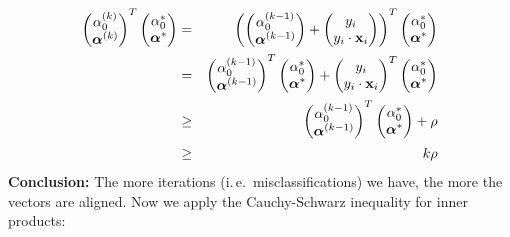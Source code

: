   \begin{eqnarray*}
    \begin{pmatrix}\alpha_0^{(k)}\\ \bm{\mathrm{\alpha}}^{(k)}\end{pmatrix}^T\begin{pmatrix}\alpha_0^*\\ \bm{\mathrm{\alpha}}^*\end{pmatrix} 
      &=&           \left( \begin{pmatrix}\alpha_0^{(k-1)}\\ \bm{\mathrm{\alpha}}^{(k-1)}\end{pmatrix} +  \begin{pmatrix}y_i\\ y_i\cdot \bm{\mathrm{x}}_i\end{pmatrix}\right)^T \begin{pmatrix}\alpha_0^*\\ \bm{\mathrm{\alpha}}^*\end{pmatrix}\\          
      &=& \begin{pmatrix}\alpha_0^{(k-1)}\\ \bm{\mathrm{\alpha}}^{(k-1)}\end{pmatrix} ^T\begin{pmatrix}\alpha_0^*\\ \bm{\mathrm{\alpha}}^*\end{pmatrix} +  \begin{pmatrix}y_i\\ y_i\cdot \bm{\mathrm{x}}_i\end{pmatrix}^T \begin{pmatrix}\alpha_0^*\\ \bm{\mathrm{\alpha}}^*\end{pmatrix} \\          
      &\geq& \begin{pmatrix}\alpha_0^{(k-1)}\\ \bm{\mathrm{\alpha}}^{(k-1)}\end{pmatrix} ^T\begin{pmatrix}\alpha_0^*\\ \bm{\mathrm{\alpha}}^*\end{pmatrix} + \rho \\         &\geq& k\rho
  \end{eqnarray*}
\textbf{Conclusion:} The more iterations (i.\,e.\ misclassifications) we have, the more the vectors are aligned. Now we apply the Cauchy-Schwarz inequality for inner products:

